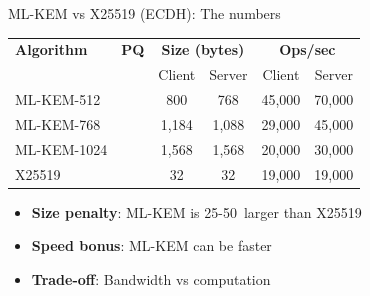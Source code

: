 \documentclass[aspectratio=169, lualatex]{beamer} %
\begin{document}
\begin{frame}{ML-KEM vs X25519 (ECDH): The numbers}
	\begin{center}
		\begin{tabular}{|l|c|c|c|c|c|}
			\hline
			\textbf{Algorithm} & \textbf{PQ}  & \multicolumn{2}{c|}{\textbf{Size (bytes)}} & \multicolumn{2}{c|}{\textbf{Ops/sec}}                   \\
			                   &              & Client                                     & Server                                & Client & Server \\
			\hline
			ML-KEM-512         & \mycheckmark & 800                                        & 768                                   & 45,000 & 70,000 \\
			ML-KEM-768         & \mycheckmark & 1,184                                      & 1,088                                 & 29,000 & 45,000 \\
			ML-KEM-1024        & \mycheckmark & 1,568                                      & 1,568                                 & 20,000 & 30,000 \\
			X25519             & \times       & 32                                         & 32                                    & 19,000 & 19,000 \\
			\hline
		\end{tabular}
	\end{center}
	\vspace{3mm}
	\begin{itemize}
		\item \textbf{Size penalty}: ML-KEM is 25-50\times\ larger than X25519
		\item \textbf{Speed bonus}: ML-KEM can be faster
		\item \textbf{Trade-off}: Bandwidth vs computation
	\end{itemize}
\end{frame}
\end{document}
